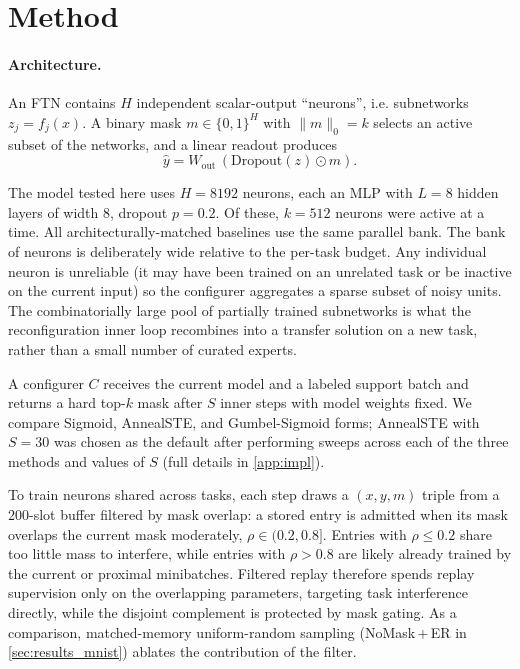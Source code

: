 \documentclass{article}
\begin{document}
\section{Method}\label{sec:method}

\paragraph{Architecture.}
An FTN contains $H$ independent scalar-output ``neurons'', i.e. subnetworks $z_j=f_j(x)$. A binary mask $m\in\{0,1\}^H$ with $\|m\|_0=k$ selects an active subset of the networks, and a linear readout produces
\[
  \hat{y} = W_\mathrm{out}\,(\mathrm{Dropout}(z)\odot m).
\]

The model tested here uses $H=8192$ neurons, each an MLP with $L=8$ hidden layers of width $8$, dropout $p=0.2$. Of these, $k=512$ neurons were active at a time. All architecturally-matched baselines use the same parallel bank. The bank of neurons is deliberately wide relative to the per-task budget. Any individual neuron is unreliable (it may have been trained on an unrelated task or be inactive on the current input) so the configurer aggregates a sparse subset of noisy units. The combinatorially large pool of partially trained subnetworks is what the reconfiguration inner loop recombines into a transfer solution on a new task, rather than a small number of curated experts.

A configurer $C$ receives the current model and a labeled support batch and returns a hard top-$k$ mask after $S$ inner steps with model weights fixed. We compare Sigmoid, AnnealSTE, and Gumbel-Sigmoid forms; AnnealSTE with $S{=}30$ was chosen as the default after performing sweeps across each of the three methods and values of $S$ (full details in \cref{app:impl}). 

To train neurons shared across tasks, each step draws a $(x,y,m)$ triple from a $200$-slot buffer filtered by mask overlap: a stored entry is admitted when its mask overlaps the current mask moderately, $\rho \in (0.2, 0.8]$. Entries with $\rho \le 0.2$ share too little mass to interfere, while entries with $\rho > 0.8$ are likely already trained by the current or proximal minibatches. Filtered replay therefore spends replay supervision only on the overlapping parameters, targeting task interference directly, while the disjoint complement is protected by mask gating. As a comparison, matched-memory uniform-random sampling (NoMask\,+\,ER in \cref{sec:results_mnist}) ablates the contribution of the filter.
\end{document}
